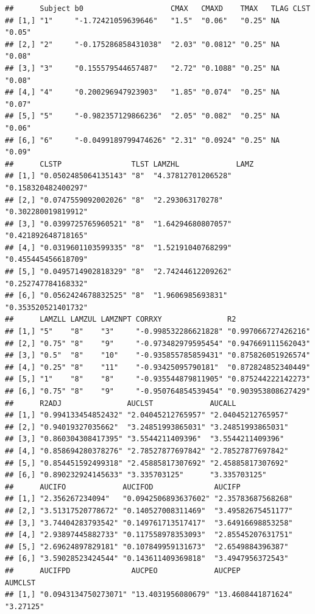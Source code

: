 \documentclass[]{krantz}
\theoremstyle{definition}
\theoremstyle{definition}
\theoremstyle{definition}
\theoremstyle{remark}
\begin{document}
\begin{verbatim}
##      Subject b0                    CMAX   CMAXD    TMAX   TLAG CLST  
## [1,] "1"     "-1.72421059639646"   "1.5"  "0.06"   "0.25" NA   "0.05"
## [2,] "2"     "-0.175286858431038"  "2.03" "0.0812" "0.25" NA   "0.08"
## [3,] "3"     "0.155579544657487"   "2.72" "0.1088" "0.25" NA   "0.08"
## [4,] "4"     "0.200296947923903"   "1.85" "0.074"  "0.25" NA   "0.07"
## [5,] "5"     "-0.982357129866236"  "2.05" "0.082"  "0.25" NA   "0.06"
## [6,] "6"     "-0.0499189799474626" "2.31" "0.0924" "0.25" NA   "0.09"
##      CLSTP                TLST LAMZHL             LAMZ               
## [1,] "0.0502485064135143" "8"  "4.37812701206528" "0.158320482400297"
## [2,] "0.0747559092002026" "8"  "2.293063170278"   "0.302280019819912"
## [3,] "0.0399725765960521" "8"  "1.64294680807057" "0.421892648718165"
## [4,] "0.0319601103599335" "8"  "1.52191040768299" "0.455445456618709"
## [5,] "0.0495714902818329" "8"  "2.74244612209262" "0.252747784168332"
## [6,] "0.0562424678832525" "8"  "1.9606985693831"  "0.353520521401732"
##      LAMZLL LAMZUL LAMZNPT CORRXY               R2                 
## [1,] "5"    "8"    "3"     "-0.998532286621828" "0.997066727426216"
## [2,] "0.75" "8"    "9"     "-0.973482979595454" "0.947669111562043"
## [3,] "0.5"  "8"    "10"    "-0.935855785859431" "0.875826051926574"
## [4,] "0.25" "8"    "11"    "-0.93425095790181"  "0.872824852340449"
## [5,] "1"    "8"    "8"     "-0.935544879811905" "0.875244222142273"
## [6,] "0.75" "8"    "9"     "-0.950764854539454" "0.903953808627429"
##      R2ADJ               AUCLST             AUCALL            
## [1,] "0.994133454852432" "2.04045212765957" "2.04045212765957"
## [2,] "0.94019327035662"  "3.24851993865031" "3.24851993865031"
## [3,] "0.860304308417395" "3.5544211409396"  "3.5544211409396" 
## [4,] "0.858694280378276" "2.78527877697842" "2.78527877697842"
## [5,] "0.854451592499318" "2.45885817307692" "2.45885817307692"
## [6,] "0.890232924145633" "3.335703125"      "3.335703125"     
##      AUCIFO             AUCIFOD              AUCIFP            
## [1,] "2.356267234094"   "0.0942506893637602" "2.35783687568268"
## [2,] "3.51317520778672" "0.140527008311469"  "3.49582675451177"
## [3,] "3.74404283793542" "0.149761713517417"  "3.64916698853258"
## [4,] "2.93897445882733" "0.117558978353093"  "2.85545207631751"
## [5,] "2.69624897829181" "0.107849959131673"  "2.6549884396387" 
## [6,] "3.59028523424544" "0.143611409369818"  "3.4947956372543" 
##      AUCIFPD              AUCPEO             AUCPEP             AUMCLST   
## [1,] "0.0943134750273071" "13.4031956080679" "13.4608441871624" "3.27125" 

\end{verbatim}
\end{document}
